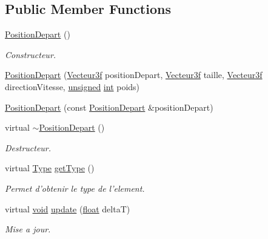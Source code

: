 \subsection*{Public Member Functions}
\begin{DoxyCompactItemize}
\item 
\hyperlink{group___i_n_f2990-04_ga2cd5d23fdefd5a5db303a8c7e2af9c3c}{Position\-Depart} ()
\begin{DoxyCompactList}\small\item\em Constructeur. \end{DoxyCompactList}\item 
\hyperlink{group___i_n_f2990-04_ga48b038debe01d96507a78be1940891f8}{Position\-Depart} (\hyperlink{group__utilitaire_ga6b2956069f76c7e27df4f79f87e5a48c}{Vecteur3f} position\-Depart, \hyperlink{group__utilitaire_ga6b2956069f76c7e27df4f79f87e5a48c}{Vecteur3f} taille, \hyperlink{group__utilitaire_ga6b2956069f76c7e27df4f79f87e5a48c}{Vecteur3f} direction\-Vitesse, \hyperlink{_free_image_8h_a425076c7067a1b5166e2cc530e914814}{unsigned} \hyperlink{wglew_8h_a500a82aecba06f4550f6849b8099ca21}{int} poids)
\item 
\hyperlink{group___i_n_f2990-04_ga407a4f493c341f2b9ce6f05d575676aa}{Position\-Depart} (const \hyperlink{class_position_depart}{Position\-Depart} \&position\-Depart)
\item 
virtual \hyperlink{group___i_n_f2990-04_ga7223f64532a213cd4faf6e29aa5c5a30}{$\sim$\-Position\-Depart} ()
\begin{DoxyCompactList}\small\item\em Destructeur. \end{DoxyCompactList}\item 
virtual \hyperlink{group___i_n_f2990-04_ga1d1cfd8ffb84e947f82999c682b666a7}{Type} \hyperlink{group___i_n_f2990-04_gae4b1d64b04abfd849ef302e41c6fc6d1}{get\-Type} ()
\begin{DoxyCompactList}\small\item\em Permet d'obtenir le type de l'element. \end{DoxyCompactList}\item 
virtual \hyperlink{wglew_8h_aeea6e3dfae3acf232096f57d2d57f084}{void} \hyperlink{group___i_n_f2990-04_gac089935dcf561edb43c8a402e6f6ace5}{update} (\hyperlink{fmod_8h_aeb841aa4b4b5f444b5d739d865b420af}{float} delta\-T)
\begin{DoxyCompactList}\small\item\em Mise a jour. \end{DoxyCompactList}\item 

\end{DoxyCompactItemize}
